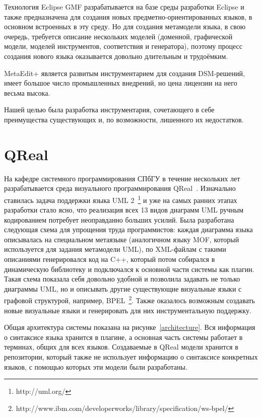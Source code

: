 \documentclass[a4paper]{article}
\begin{document}
Технология Eclipse GMF разрабатывается на базе среды разработки Eclipse и также предназначена для создания новых предметно-ориентированных языков, в основном встроенных в эту среду. Но для создания метамодели языка, в свою очередь, требуется описание нескольких моделей (доменной, графической модели, моделей инструментов, соответствия и генератора), поэтому процесс создания нового языка оказывается довольно длительным и трудоёмким.

MetaEdit+ является развитым инструментарием для создания DSM-решений, имеет большое число промышленных внедрений, но цена лицензии на него весьма высока.

Нашей целью была разработка инструментария, сочетающего в себе преимущества существующих и, по возможности, лишенного их недостатков.

\section{QReal}

На кафедре системного программирования СПбГУ в течение нескольких лет разрабатывается среда визуального программирования QReal~\cite{qReal}. Изначально ставилась задача поддержки языка UML 2~\footnote{http://uml.org/} и уже на самых ранних этапах разработки стало ясно, что реализация всех 13 видов диаграмм UML ручным кодированием потребует неоправданно больших усилий. Была разработана следующая схема для упрощения труда программистов: каждая диаграмма языка описывалась на специальном метаязыке (аналогичном языку MOF, который используется для задания метамодели UML), по XML-файлам с такими описаниями генерировался код на C++, который потом собирался в динамическую библиотеку и подключался к основной части системы как плагин. Такая схема показала себя довольно удобной и позволила задавать не только диаграммы UML, но и описывать другие существующие визуальные языки с графовой структурой, например, BPEL~\footnote{http://www.ibm.com/developerworks/library/specification/ws-bpel/}. Также оказалось возможным создавать новые визуальные языки и генерировать для них инструментальную поддержку. 

Общая архитектура системы показана на рисунке~\ref{architecture}. Вся информация о синтаксисе языка хранится в плагине, а основная часть системы работает в терминах, общих для всех языков. Создаваемые в QReal модели хранится в репозитории, который также не использует информацию о синтаксисе конкретных языков, с помощью которых эти модели были разработаны.
\end{document}
